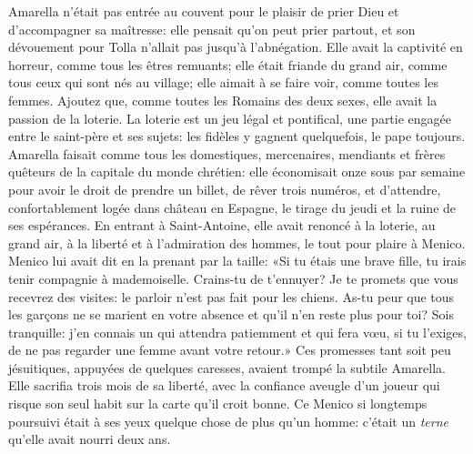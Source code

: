 
Amarella n'était pas entrée au couvent pour le plaisir de prier Dieu et d'accompagner sa maîtresse: elle pensait qu'on peut prier partout, et son dévouement pour Tolla n'allait pas jusqu'à l'abnégation. Elle avait la captivité en horreur, comme tous les êtres remuants; elle était friande du grand air, comme tous ceux qui sont nés au village; elle aimait à se faire voir, comme toutes les femmes. Ajoutez que, comme toutes les Romains des deux sexes, elle avait la passion de la loterie. La loterie est un jeu légal et pontifical, une partie engagée entre le saint-père et ses sujets: les fidèles y gagnent quelquefois, le pape toujours. Amarella faisait comme tous les domestiques, mercenaires, mendiants et frères quêteurs de la capitale du monde chrétien: elle économisait onze sous par semaine pour avoir le droit de prendre un billet, de rêver trois numéros, et d'attendre, confortablement logée dans château en Espagne, le tirage du jeudi et la ruine de ses espérances. En entrant à Saint-Antoine, elle avait renoncé à la loterie, au grand air, à la liberté et à l'admiration des hommes, le tout pour plaire à Menico. Menico lui avait dit en la prenant par la taille: «Si tu étais une brave fille, tu irais tenir compagnie à mademoiselle. Crains-tu de t'ennuyer? Je te promets que vous recevrez des visites: le parloir n'est pas fait pour les chiens. As-tu peur que tous les garçons ne se marient en votre absence et qu'il n'en reste plus pour toi? Sois tranquille: j'en connais un qui attendra patiemment et qui fera v\oe{}u, si tu l'exiges, de ne pas regarder une femme avant votre retour.» Ces promesses tant soit peu jésuitiques, appuyées de quelques caresses, avaient trompé la subtile Amarella. Elle sacrifia trois mois de sa liberté, avec la confiance aveugle d'un joueur qui risque son seul habit sur la carte qu'il croit bonne. Ce Menico si longtemps poursuivi était à ses yeux quelque chose de plus qu'un homme: c'était un \emph{terne} qu'elle avait nourri deux ans.

